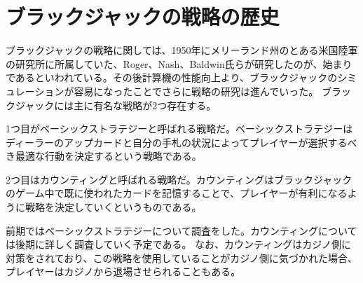
\section{ブラックジャックの戦略の歴史}
ブラックジャックの戦略に関しては、1950年にメリーランド州のとある米国陸軍の研究所に所属していた、Roger、Nash、Baldwin氏らが研究したのが、始まりであるといわれている。その後計算機の性能向上より、ブラックジャックのシミュレーションが容易になったことでさらに戦略の研究は進んでいった。
ブラックジャックには主に有名な戦略が2つ存在する。

1つ目がベーシックストラテジーと呼ばれる戦略だ。ベーシックストラテジーはディーラーのアップカードと自分の手札の状況によってプレイヤーが選択するべき最適な行動を決定するという戦略である。

2つ目はカウンティングと呼ばれる戦略だ。カウンティングはブラックジャックのゲーム中で既に使われたカードを記憶することで、プレイヤーが有利になるように戦略を決定していくというものである。

前期ではベーシックストラテジーについて調査をした。カウンティングについては後期に詳しく調査していく予定である。
なお、カウンティングはカジノ側に対策をされており、この戦略を使用していることがカジノ側に気づかれた場合、プレイヤーはカジノから退場させられることもある。
